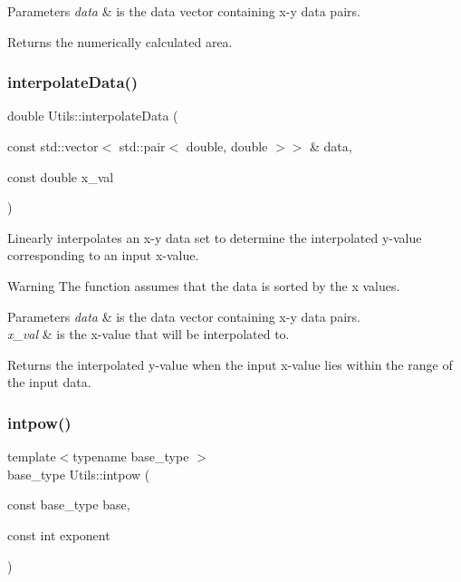 \begin{DoxyParams}{Parameters}
{\em data} & is the data vector containing x-\/y data pairs. \\
\hline
\end{DoxyParams}
\begin{DoxyReturn}{Returns}
the numerically calculated area. 
\end{DoxyReturn}
\mbox{\label{namespace_utils_af68995497777ee14d812c65991a4046f}} 
\subsubsection{\texorpdfstring{interpolate\+Data()}{interpolateData()}}
{\footnotesize\ttfamily double Utils\+::interpolate\+Data (\begin{DoxyParamCaption}\item[{const std\+::vector$<$ std\+::pair$<$ double, double $>$$>$ \&}]{data,  }\item[{const double}]{x\+\_\+val }\end{DoxyParamCaption})}



Linearly interpolates an x-\/y data set to determine the interpolated y-\/value corresponding to an input x-\/value. 

\begin{DoxyWarning}{Warning}
The function assumes that the data is sorted by the x values. 
\end{DoxyWarning}

\begin{DoxyParams}{Parameters}
{\em data} & is the data vector containing x-\/y data pairs. \\
\hline
{\em x\+\_\+val} & is the x-\/value that will be interpolated to. \\
\hline
\end{DoxyParams}
\begin{DoxyReturn}{Returns}
the interpolated y-\/value when the input x-\/value lies within the range of the input data. 
\end{DoxyReturn}
\mbox{\label{namespace_utils_affd19edaa58a3f8425e1f7b4c9233f8a}} 
\subsubsection{\texorpdfstring{intpow()}{intpow()}}
{\footnotesize\ttfamily template$<$typename base\+\_\+type $>$ \\
base\+\_\+type Utils\+::intpow (\begin{DoxyParamCaption}\item[{const base\+\_\+type}]{base,  }\item[{const int}]{exponent }\end{DoxyParamCaption})}



